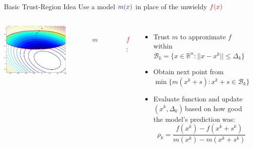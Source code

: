 \documentclass[handout,aspectratio=54]{beamer}
\numberwithin{theorem}{section}
\begin{document}
\begin{frame}{Basic Trust-Region Idea}
Use a model $\textcolor{blue}{m(x)}$ in place of the unwieldy $\textcolor{red}{f(x)}$

\begin{columns}
\includegraphics[width=\textwidth]{fig/22-5.jpg}

\colorbox[rgb]{0.5,0.6,0.7}{\textcolor{white}{Optimize over }$\textcolor{blue}{m}$ \textcolor{white}{to avoidexpense }}

\colorbox[rgb]{0.5,0.6,0.7}{\textcolor{white}{of} $\textcolor{red}{f}$:}

\begin{itemize}
\item Trust $m$ to approximate $f$ within $ \mathcal{B}_k=\{x\in\mathbb{R}^n:||x-x^k||\le \Delta_k\}$
\item Obtain next point from $\min\{m(x^k+s):x^k+s\in  \mathcal{B}_k\}$
\item Evaluate function and update $(x^k, \Delta_k)$\,based on how good the model's prediction was:
\begin{equation*}
\rho_k=\frac{f(x^k)-f(x^k+s^k)}{m(x^k)-m(x^k+s^k)}
\end{equation*}
\end{itemize}

\footnotesize{}
\end{columns}
\end{frame}
\end{document}

